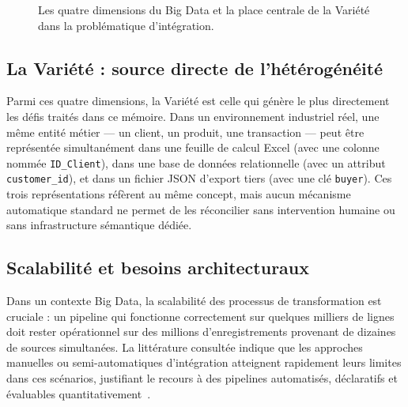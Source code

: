 \begin{figure}[ht]
    
    \vspace{0.5cm}
    \caption{Les quatre dimensions du Big Data et la place centrale de la Variété dans la problématique d'intégration.}
    \label{fig:4v_bigdata}
\end{figure}

\subsection{La Variété : source directe de l'hétérogénéité}
Parmi ces quatre dimensions, la Variété est celle qui génère le plus directement les défis traités dans ce mémoire. Dans un environnement industriel réel, une même entité métier — un client, un produit, une transaction — peut être représentée simultanément dans une feuille de calcul Excel (avec une colonne nommée \texttt{ID\_Client}), dans une base de données relationnelle (avec un attribut \texttt{customer\_id}), et dans un fichier JSON d'export tiers (avec une clé \texttt{buyer}). Ces trois représentations réfèrent au même concept, mais aucun mécanisme automatique standard ne permet de les réconcilier sans intervention humaine ou sans infrastructure sémantique dédiée.

\subsection{Scalabilité et besoins architecturaux}
Dans un contexte Big Data, la scalabilité des processus de transformation est cruciale : un pipeline qui fonctionne correctement sur quelques milliers de lignes doit rester opérationnel sur des millions d'enregistrements provenant de dizaines de sources simultanées. La littérature consultée indique que les approches manuelles ou semi-automatiques d'intégration atteignent rapidement leurs limites dans ces scénarios, justifiant le recours à des pipelines automatisés, déclaratifs et évaluables quantitativement~\cite{wu2023comprehensive, yan2023enterprise}.


